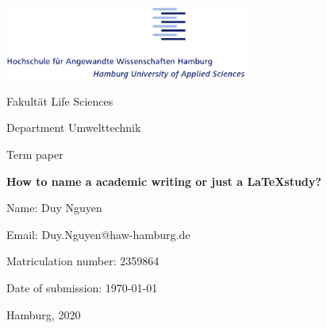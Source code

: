 \begin{titlepage}
	\begin{flushright}
		\includegraphics[width=0.6\textwidth]{HAW_logo.png}

		Fakult\"at Life Sciences

		Department Umwelttechnik
	\end{flushright}
	
	\vspace{3cm}

	\begin{center}
		\large{Term paper}

		\huge{\textbf{How to name a academic writing or just a \LaTeX  study?}}

		\vspace{1cm}
		

	\end{center}

	\vspace{5cm}

	\begin{flushleft}
		Name: Duy Nguyen

		Email: Duy.Nguyen@haw-hamburg.de

		Matriculation number: 2359864

		Date of submission: \today
	\end{flushleft}

	\vfill
	\begin{center}
	Hamburg, 2020
	\end{center}
	\clearpage
\end{titlepage}
